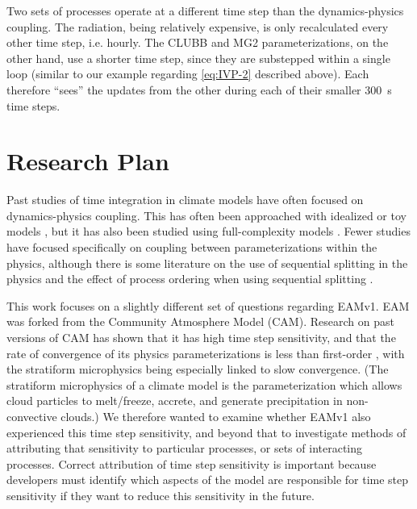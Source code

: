 \documentclass [11pt, proquest] {uwthesis}[2020/02/24]
\begin{document}
Two sets of processes operate at a different time step than the dynamics-physics coupling. The radiation, being relatively expensive, is only recalculated every other time step, i.e. hourly. The CLUBB and MG2 parameterizations, on the other hand, use a shorter time step, since they are substepped within a single loop (similar to our example regarding \eqref{eq:IVP-2} described above). Each therefore ``sees'' the updates from the other during each of their smaller \SI{300}{\second} time steps.

\section{Research Plan} \label{sec:approach}

Past studies of time integration in climate models have often focused on dynamics-physics coupling. This has often been approached with idealized or toy models \parencite{Staniforth2002a,Staniforth2002b,Dubal2004,Dubal2005,Dubal2006}, but it has also been studied using full-complexity models \parencite{Beljaars2004,Williamson2003,Williamson2013,Mishra2008,Mishra2011,Yu2015}. Fewer studies have focused specifically on coupling between parameterizations within the physics, although there is some literature on the use of sequential splitting in the physics and the effect of process ordering when using sequential splitting \parencite{Beljaars1991,Donahue2018}.

This work focuses on a slightly different set of questions regarding EAMv1. EAM was forked from the Community Atmosphere Model (CAM). Research on past versions of CAM has shown that it has high time step sensitivity, and that the rate of convergence of its physics parameterizations is less than first-order \parencite{Wan2015}, with the stratiform microphysics being especially linked to slow convergence. (The stratiform microphysics of a climate model is the parameterization which allows cloud particles to melt/freeze, accrete, and generate precipitation in non-convective clouds.) We therefore wanted to examine whether EAMv1 also experienced this time step sensitivity, and beyond that to investigate methods of attributing that sensitivity to particular processes, or sets of interacting processes. Correct attribution of time step sensitivity is important because developers must identify which aspects of the model are responsible for time step sensitivity if they want to reduce this sensitivity in the future.
\end{document}
